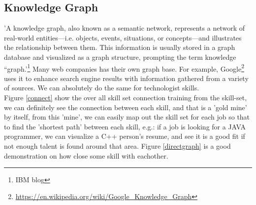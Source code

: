 \subsection{Knowledge Graph}
'A knowledge graph, also known as a semantic network, represents a network of real-world entities—i.e. objects, events, situations, or concepts—and illustrates the relationship between them. This information is usually stored in a graph database and visualized as a graph structure, prompting the term knowledge “graph.'\footnote{IBM blog} Many web companies has their own graph base. For example, Google\footnote{\url{https://en.wikipedia.org/wiki/Google_Knowledge_Graph}} uses it to enhance search engine results with information gathered from a variety of sources. We can absolutely do the same for  technologist skills.\\
Figure \ref{connect} show the over all skill set connection training from the skill-set, we can definitely see the connection between each skill, and that is a 'gold mine' by itself, from this 'mine', we can easily map out the skill set for each job so that to find the 'shortest path' between each skill, e.g.: if a job is looking for a JAVA programmer, we can visualize a C++ person's resume, and see it is a good fit if not enough talent is found around that area. Figure \ref{directgraph} is a good demonstration on how close some skill with eachother. 
